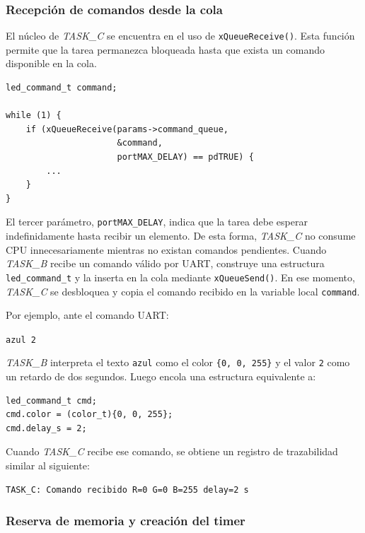 \documentclass[12pt,letterpaper]{article}
\begin{document}
\subsubsection{Recepción de comandos desde la cola}

El núcleo de \textit{TASK\_C} se encuentra en el uso de \texttt{xQueueReceive()}. Esta función permite que la tarea permanezca bloqueada hasta que exista un comando disponible en la cola.

\begin{lstlisting}
led_command_t command;

while (1) {
    if (xQueueReceive(params->command_queue,
                      &command,
                      portMAX_DELAY) == pdTRUE) {
        ...
    }
}
\end{lstlisting}

El tercer parámetro, \texttt{portMAX\_DELAY}, indica que la tarea debe esperar indefinidamente hasta recibir un elemento. De esta forma, \textit{TASK\_C} no consume CPU innecesariamente mientras no existan comandos pendientes. Cuando \textit{TASK\_B} recibe un comando válido por UART, construye una estructura \texttt{led\_command\_t} y la inserta en la cola mediante \texttt{xQueueSend()}. En ese momento, \textit{TASK\_C} se desbloquea y copia el comando recibido en la variable local \texttt{command}.

Por ejemplo, ante el comando UART:

\begin{center}
\texttt{azul 2}
\end{center}

\textit{TASK\_B} interpreta el texto \texttt{azul} como el color \texttt{\{0, 0, 255\}} y el valor \texttt{2} como un retardo de dos segundos. Luego encola una estructura equivalente a:

\begin{lstlisting}
led_command_t cmd;
cmd.color = (color_t){0, 0, 255};
cmd.delay_s = 2;
\end{lstlisting}

Cuando \textit{TASK\_C} recibe ese comando, se obtiene un registro de trazabilidad similar al siguiente:

\begin{lstlisting}
TASK_C: Comando recibido R=0 G=0 B=255 delay=2 s
\end{lstlisting}

\subsubsection{Reserva de memoria y creación del timer}
\end{document}

